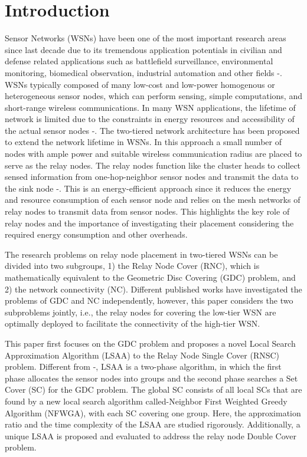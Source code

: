 \documentclass[journal]{IEEEtran}
\begin{document}
\section{Introduction}
 Sensor Networks (WSNs) have been one of the most important research areas since last decade due to its tremendous application
potentials in civilian and defense related applications such as battlefield surveillance, environmental monitoring, biomedical observation, industrial automation and other fields \cite{Akyildiz02}-\cite{Estrin99}. WSNs typically composed of many low-cost and low-power homogenous or heterogeneous sensor nodes, which can perform sensing,
simple computations, and short-range wireless communications. In many WSN applications, the lifetime of network is limited due to the constraints
in energy resources and accessibility of the actual sensor nodes \cite{Yick08}-\cite{He10}. The two-tiered network architecture has been proposed to
extend the network lifetime in WSNs. In this approach a small number of nodes with ample power and suitable wireless communication radius are
placed to serve as the relay nodes. The relay nodes function like the cluster heads to collect sensed information from one-hop-neighbor sensor
nodes and transmit the data to the sink node \cite{Gupta03}-\cite{He12}. This is an energy-efficient approach since it reduces the
energy and resource consumption of each sensor node and relies on the mesh networks of relay nodes to transmit data from sensor nodes. This highlights
the key role of relay nodes and the importance of investigating their placement considering the required energy consumption and other overheads.

The research problems on relay node placement in two-tiered WSNs can be divided into two subgroups, 1) the Relay Node Cover (RNC), which is mathematically equivalent to the Geometric Disc Covering (GDC) problem, and 2) the network
connectivity (NC). Different published works have investigated the problems of GDC and NC independently, however, this paper considers the two subproblems jointly, i.e., the relay nodes for covering the low-tier WSN are optimally deployed to facilitate the connectivity of the high-tier WSN.

This paper first focuses on the GDC problem and proposes a novel Local Search Approximation Algorithm (LSAA) to the Relay Node Single Cover (RNSC) problem. Different from \cite{Fowler81}-\cite{Ali11}, LSAA is a two-phase algorithm, in which the first phase allocates the sensor nodes into groups and the second phase searches a Set Cover (SC) for the GDC problem. The global SC consists of all local SCs that are found by a new local search algorithm called-Neighbor First Weighted Greedy Algorithm (NFWGA), with each SC covering one group. Here, the approximation ratio and the time complexity of the LSAA are studied rigorously. Additionally, a unique LSAA is proposed and evaluated to address the relay node Double Cover problem.
\end{document}
